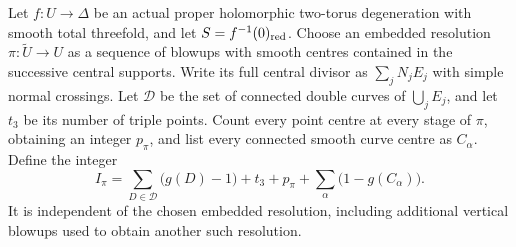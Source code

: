 \label{cdp:st:C.2.UN.39}

Let $f:U\to\Delta$ be an actual proper holomorphic
two-torus degeneration with smooth total threefold,
and let $S=f^{-1}(0)_{\rm red}$. Choose an embedded
resolution $\pi:\widetilde U\to U$ as a sequence
of blowups with smooth centres contained in the
successive central supports. Write its full
central divisor as $\sum_jN_jE_j$ with simple
normal crossings. Let $\mathcal D$ be the set
of connected double curves of $\bigcup_jE_j$,
and let $t_3$ be its number of triple points.
Count every point centre at every stage of
$\pi$, obtaining an integer $p_\pi$, and list
every connected smooth curve centre as $C_\alpha$.
Define the integer
\[
 I_\pi=
     \sum_{D\in\mathcal D}\bigl(g(D)-1\bigr)+t_3
       +p_\pi+\sum_\alpha\bigl(1-g(C_\alpha)\bigr).
                                                               \tag{C.ZC.1}\label{cdp:eq:C.ZC.1}
\]
It is independent of the chosen embedded
resolution, including additional vertical
blowups used to obtain another such resolution.

